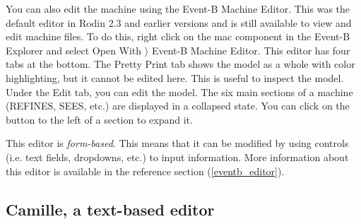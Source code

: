 You can also edit the machine using the Event-B Machine Editor. This was the default editor in Rodin 2.3 and earlier versions and is still available to view and edit machine files. To do this, right click on the \textsf{mac} component in the Event-B Explorer and select \textsf{Open With $\rangle$ Event-B Machine Editor}. This editor has four tabs at the bottom.  The \textsf{Pretty Print} tab shows the model as a whole with color highlighting, but it cannot be edited here.  This is useful to inspect the model. Under the \textsf{Edit} tab, you can edit the model.  The six main sections of a machine (REFINES, SEES, etc.) are displayed in a collapsed state.  You can click on the  button to the left of a section to expand it.


This editor is \textit{form-based}.  This means that it can be modified by using controls (i.e. text fields, dropdowns, etc.) to input information. More information about this editor is available in the reference section (\ref{eventb_editor}).


\subsection{Camille, a text-based editor}
\label{tut_camille}

